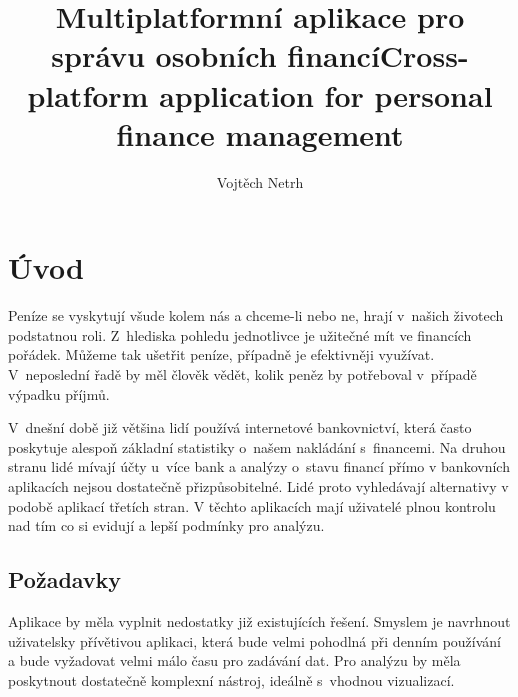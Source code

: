 \documentclass[
  biblatex,
  figures=true,
  tables=false,
  glossaries,
  index
]{kidiplom}
\title{Multiplatformní aplikace pro správu osobních financí}
\title[english]{Cross-platform application for personal finance management}
\author{Vojtěch Netrh}
\begin{document}
\maketitle



\newcommand{\BibLaTeX}{\textsc{Bib}\LaTeX}


\section{Úvod}
Peníze se vyskytují všude kolem nás a chceme-li nebo ne, hrají v~našich životech podstatnou roli. Z~hlediska pohledu jednotlivce je užitečné mít ve financích pořádek. Můžeme tak ušetřit peníze, případně je efektivněji využívat. V~neposlední řadě by měl člověk vědět, kolik peněz by potřeboval v~případě výpadku příjmů.

V~dnešní době již většina lidí používá internetové bankovnictví, která často poskytuje alespoň základní statistiky o~našem nakládání s~financemi. Na druhou stranu lidé mívají účty u~více bank a analýzy o~stavu financí přímo v bankovních aplikacích nejsou dostatečně přizpůsobitelné. Lidé proto vyhledávají alternativy v podobě aplikací třetích stran. V těchto aplikacích mají uživatelé plnou kontrolu nad tím co si evidují a lepší podmínky pro analýzu.

\subsection{Požadavky}
Aplikace by měla vyplnit nedostatky již existujících řešení. Smyslem je navrhnout uživatelsky přívětivou aplikaci, která bude velmi pohodlná při denním používání a bude vyžadovat velmi málo času pro zadávání dat. Pro analýzu by měla poskytnout dostatečně komplexní nástroj, ideálně s~vhodnou vizualizací.
\end{document}
